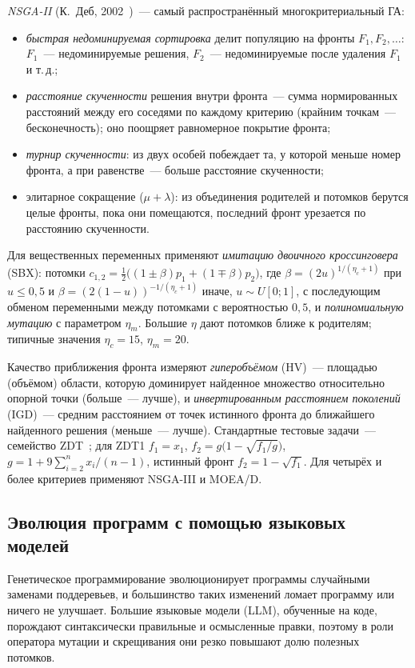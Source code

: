 \emph{NSGA-II} (К.~Деб, 2002~\cite{deb2002})~--- самый распространённый многокритериальный ГА:
\begin{itemize}
\item \emph{быстрая недоминируемая сортировка} делит популяцию на фронты $F_1, F_2, \ldots$: $F_1$~---
недоминируемые решения, $F_2$~--- недоминируемые после удаления $F_1$ и т.\,д.;
\item \emph{расстояние скученности} решения внутри фронта~--- сумма нормированных расстояний между его
соседями по каждому критерию (крайним точкам~--- бесконечность); оно поощряет равномерное покрытие фронта;
\item \emph{турнир скученности}: из двух особей побеждает та, у которой меньше номер фронта, а при
равенстве~--- больше расстояние скученности;
\item элитарное сокращение ($\mu + \lambda$): из объединения родителей и потомков берутся целые фронты,
пока они помещаются, последний фронт урезается по расстоянию скученности.
\end{itemize}
Для вещественных переменных применяют \emph{имитацию двоичного кроссинговера} (SBX): потомки
$c_{1,2} = \frac12\bigl((1 \pm \beta)p_1 + (1 \mp \beta)p_2\bigr)$, где $\beta = (2u)^{1/(\eta_c + 1)}$ при
$u \le 0,5$ и $\beta = (2(1 - u))^{-1/(\eta_c + 1)}$ иначе, $u \sim U[0; 1]$, с последующим обменом
переменными между потомками с вероятностью $0,5$, и \emph{полиномиальную мутацию} с параметром
$\eta_m$. Большие $\eta$ дают потомков ближе к родителям; типичные значения $\eta_c = 15$, $\eta_m = 20$.

Качество приближения фронта измеряют \emph{гиперобъёмом} (HV)~--- площадью (объёмом) области, которую
доминирует найденное множество относительно опорной точки (больше~--- лучше), и \emph{инвертированным
расстоянием поколений} (IGD)~--- средним расстоянием от точек истинного фронта до ближайшего найденного
решения (меньше~--- лучше). Стандартные тестовые задачи~--- семейство ZDT~\cite{zitzler2000}; для
ZDT1 $f_1 = x_1$, $f_2 = g\bigl(1 - \sqrt{f_1/g}\bigr)$, $g = 1 + 9\sum_{i=2}^{n}x_i/(n - 1)$, истинный фронт
$f_2 = 1 - \sqrt{f_1}$. Для четырёх и более критериев применяют NSGA-III и MOEA/D.

\subsection{Эволюция программ с помощью языковых моделей}
\label{sec:llm-evolution}

Генетическое программирование эволюционирует программы случайными заменами поддеревьев, и большинство
таких изменений ломает программу или ничего не улучшает. Большие языковые модели (LLM), обученные на
коде, порождают синтаксически правильные и осмысленные правки, поэтому в роли оператора мутации и
скрещивания они резко повышают долю полезных потомков.

